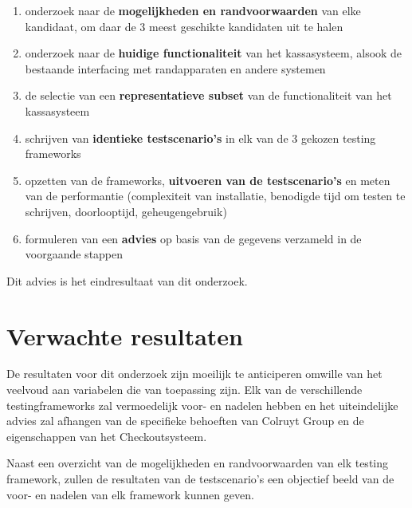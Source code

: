 \begin{enumerate}
    \item onderzoek naar de \textbf{mogelijkheden en randvoorwaarden} van elke kandidaat, om daar de 3 meest geschikte kandidaten uit te halen
    \item onderzoek naar de \textbf{huidige functionaliteit} van het kassasysteem, alsook de bestaande interfacing met randapparaten en andere systemen
    \item de selectie van een \textbf{representatieve subset} van de functionaliteit van het kassasysteem
    \item schrijven van \textbf{identieke testscenario's} in elk van de 3 gekozen testing frameworks
    \item opzetten van de frameworks, \textbf{uitvoeren van de testscenario's} en meten van de performantie (complexiteit van installatie, benodigde tijd om testen te schrijven, doorlooptijd, geheugengebruik)
    \item formuleren van een \textbf{advies} op basis van de gegevens verzameld in de voorgaande stappen
\end{enumerate}
\vspace{\baselineskip}
Dit advies is het eindresultaat van dit onderzoek.


\section{Verwachte resultaten}
\label{sec:verwachte_resultaten}

De resultaten voor dit onderzoek zijn moeilijk te anticiperen omwille van het veelvoud aan variabelen die van toepassing zijn. Elk van de verschillende testingframeworks zal vermoedelijk voor- en nadelen hebben en het uiteindelijke advies zal afhangen van de specifieke behoeften van Colruyt Group en de eigenschappen van het Checkoutsysteem.

Naast een overzicht van de mogelijkheden en randvoorwaarden van elk testing framework, zullen de resultaten van de testscenario's een objectief beeld van de voor- en nadelen van elk framework kunnen geven.

